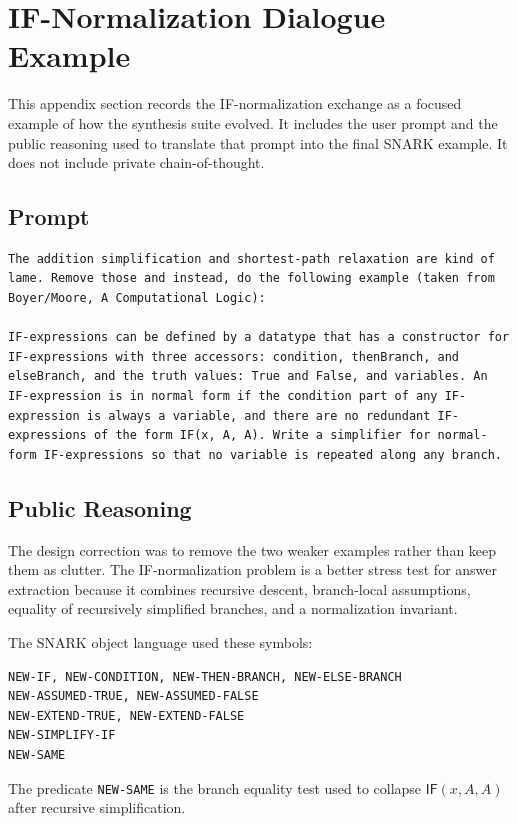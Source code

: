 \documentclass[runningheads]{llncs}
\begin{document}
\section{IF-Normalization Dialogue Example}

This appendix section records the IF-normalization exchange as a focused
example of how the synthesis suite evolved.  It includes the user prompt and
the public reasoning used to translate that prompt into the final SNARK
example.  It does not include private chain-of-thought.

\subsection{Prompt}

\begin{lstlisting}
The addition simplification and shortest-path relaxation are kind of lame. Remove those and instead, do the following example (taken from Boyer/Moore, A Computational Logic):

IF-expressions can be defined by a datatype that has a constructor for IF-expressions with three accessors: condition, thenBranch, and elseBranch, and the truth values: True and False, and variables. An IF-expression is in normal form if the condition part of any IF-expression is always a variable, and there are no redundant IF-expressions of the form IF(x, A, A). Write a simplifier for normal-form IF-expressions so that no variable is repeated along any branch.
\end{lstlisting}

\subsection{Public Reasoning}

The design correction was to remove the two weaker examples rather than keep
them as clutter.  The IF-normalization problem is a better stress test for
answer extraction because it combines recursive descent, branch-local
assumptions, equality of recursively simplified branches, and a normalization
invariant.

The SNARK object language used these symbols:
\begin{lstlisting}
NEW-IF, NEW-CONDITION, NEW-THEN-BRANCH, NEW-ELSE-BRANCH
NEW-ASSUMED-TRUE, NEW-ASSUMED-FALSE
NEW-EXTEND-TRUE, NEW-EXTEND-FALSE
NEW-SIMPLIFY-IF
NEW-SAME
\end{lstlisting}
The predicate \texttt{NEW-SAME} is the branch equality test used to collapse
\(\mathsf{IF}(x,A,A)\) after recursive simplification.
\end{document}
